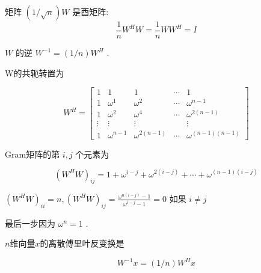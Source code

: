\begin{corollary}
    矩阵 $ (1 / \sqrt{n}) W $ 是酉矩阵:
$$
\frac{1}{n} W^{H} W=\frac{1}{n} W W^{H}=I
$$
\end{corollary}

\begin{corollary}
    $ W $ 的逆 $ W^{-1}=(1 / n) W^{H} $ .
\end{corollary}

\begin{corollary}
    W的共轭转置为

    $$ W^{H}=\left[\begin{array}{ccccc}1 & 1 & 1 & \cdots & 1 \\ 1 & \omega^{1} & \omega^{2} & \cdots & \omega^{n-1} \\ 1 & \omega^{2} & \omega^{4} & \cdots & \omega^{2(n-1)} \\ \vdots & \vdots & \vdots & & \vdots \\ 1 & \omega^{n-1} & \omega^{2(n-1)} & \cdots & \omega^{(n-1)(n-1)}\end{array}\right] $$
\end{corollary}

\begin{corollary}
    Gram矩阵的第 $ i, j $ 个元素为

    $$ \left(W^{H} W\right)_{i j}=1+\omega^{i-j}+\omega^{2(i-j)}+\cdots+\omega^{(n-1)(i-j)} $$
    
$ \left(W^{H} W\right)_{i i}=n, \left(W^{H} W\right)_{i j}=\frac{\omega^{n(i-j)}-1}{\omega^{i-j}-1}=0 $ 如果 $ i \neq j $

最后一步因为 $ \omega^{n}=1 $ .
\end{corollary}

\begin{definition}[离散傅里叶反变换]
    $n$维向量$x$的离散傅里叶反变换是 

    $$ W^{-1} x=(1 / n) W^{H} x $$
\end{definition}